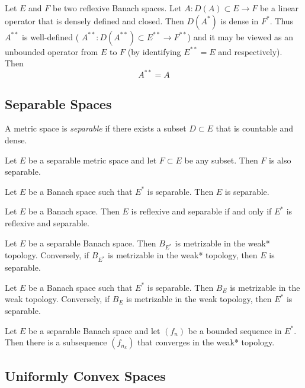 \begin{thm}
	Let $ E $ and $ F $ be two reflexive Banach spaces. Let $ A: D(A) \subset E \to F $ be a linear operator that is densely defined and closed. Then $ D(A^{*}) $ is dense in $ F^{*} $. Thus $ A^{**} $ is well-defined ( $ A^{**}: D(A^{**}) \subset E^{**} \to F^{**} $) and it may be viewed as an unbounded operator from $ E $ to $ F $ (by identifying $ E^{**}= E $ and respectively). Then
	\[
	A^{**} = A
	\]
	
\end{thm}

\subsection{Separable Spaces}

\begin{defn}
A metric space is \textit{separable} if there exists a subset $ D \subset E $ that is countable and dense.
\end{defn}

\begin{prop}
Let $ E $ be a separable metric space and let $ F \subset E $ be any subset. Then $ F $ is also separable.
\end{prop}

\begin{thm}
Let $ E $ be a Banach space such that $ E^{*} $ is separable. Then $ E $ is separable.
\end{thm}

\begin{cor}
Let $ E $ be a Banach space. Then $ E $ is reflexive and separable if and only if $ E^{*} $ is reflexive and separable.
\end{cor}

\begin{thm}
Let $ E $ be a separable Banach space. Then $ B_{E^{*}} $ is metrizable in the weak* topology. Conversely, if $ B_{E^{*}} $ is metrizable in the weak* topology, then $ E $ is separable.
\end{thm}

\begin{thm}
Let $ E $ be a Banach space such that $ E^{*} $ is separable. Then $ B_{E} $ is metrizable in the weak topology. Conversely, if $ B_{E} $ is metrizable in the weak topology, then $ E^{*} $ is separable.
\end{thm}

\begin{cor}
	Let $ E $ be a separable Banach space and let $ (f_{n}) $ be a bounded sequence in $ E^{*} $. Then there is a subsequence $ (f_{n_{k}}) $ that converges in the weak* topology.
\end{cor}

\subsection{Uniformly Convex Spaces}
